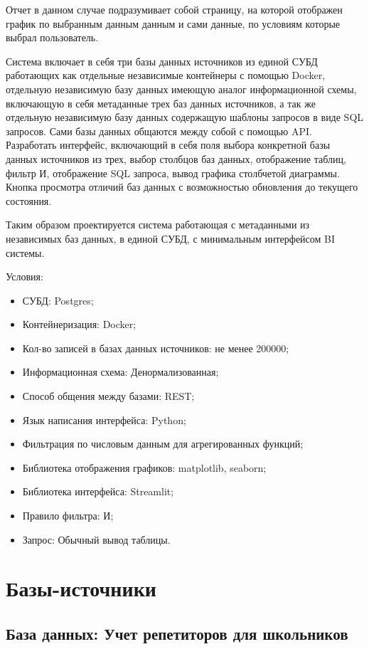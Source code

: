 \documentclass[areasetadvanced]{scrartcl}
\begin{document}
Отчет в данном случае подразумивает собой страницу, на которой отображен график по выбранным данным данным и сами данные, по условиям которые выбрал пользователь.

Система включает в себя три базы данных источников из единой СУБД работающих как отдельные 
независимые контейнеры с помощью Docker, отдельную независимую базу данных имеющую аналог информационной 
схемы, включающую в себя метаданные трех баз данных источников, а так же отдельную независимую базу данных содержащую 
шаблоны запросов в виде SQL запросов. Сами базы данных общаются между собой с помощью API.
Разработать интерфейс, включающий в себя поля выбора конкретной базы данных источников из трех,
выбор столбцов баз данных, отображение таблиц, фильтр \guillemetleft И\guillemetright, отображение SQL запроса, вывод графика столбчетой диаграммы.
Кнопка просмотра отличий баз данных с возможностью обновления до текущего состояния. 

Таким образом проектируется система работающая с метаданными из независимых баз данных, в единой СУБД,
с минимальным интерфейсом BI системы. 

Условия:

\begin{itemize}
    \item СУБД: Postgres;
    \item Контейнеризация: Docker;
    \item Кол-во записей в базах данных источников: не менее 200000;
    \item Информационная схема: Денормализованная;
    \item Способ общения между базами: REST;
    \item Язык написания интерфейса: Python;
    \item Фильтрация по числовым данным для агрегированных функций;
    \item Библиотека отображения графиков: matplotlib, seaborn;
    \item Библиотека интерфейса: Streamlit;
    \item Правило фильтра: \guillemetleft И\guillemetright;
    \item Запрос: Обычный вывод таблицы.
\end{itemize}


\newpage
\section{Базы-источники}
\subsection{База данных: Учет репетиторов для школьников}
\end{document}
